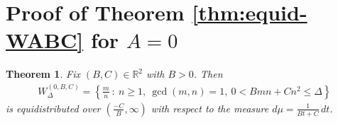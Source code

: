 \documentclass[11pt,letterpaper,reqno]{amsart}
\newtheorem{theorem}{Theorem}[section]
\numberwithin{equation}{section}
\numberwithin{figure}{section}
\numberwithin{table}{section}
\newcommand{\lrcb}[1]{\left\{#1\right\}}
\newcommand{\RR}{\mathbb{R}}
\begin{document}











\section{Proof of Theorem \ref{thm:equid-WABC} for \texorpdfstring{$A=0$}{A=0}}
\label{sec:equid-WABC--A=0}






{
\renewcommand{\thetheorem}{\ref{thm:equid-WABC} (\(A=0,B>0\))}
\begin{theorem} 
    \label{thm:equid-W--A=0,B>0}
    Fix $(B,C) \in \RR^2$ with $B > 0$. Then
    \begin{align}
        W_{\Delta}^{(0,B,C)} = \lrcb{\frac{m}{n}  ~:~ n\ge1,~ \gcd(m,n)=1,~ 0 < B mn + C n^2 \le \Delta} 
    \end{align} 
    is equidistributed over $(\frac{-C}{B},\infty)$ with respect to the measure $d\mu = \frac{1}{Bt+C} \,dt$.
\end{theorem}
}
\end{document}
